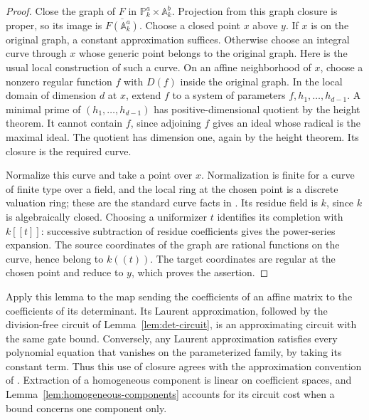 \begin{proof}
Close the graph of $F$ in $\mathbb P^a_k\times\mathbb A^b_k$.
Projection from this graph closure is proper, so its image is
$\overline{F(\mathbb A^a_k)}$.  Choose a closed point $x$ above
$y$.  If $x$ is on the original graph, a constant approximation
suffices.  Otherwise choose an integral curve through $x$ whose
generic point belongs to the original graph.  Here is the usual
local construction of such a curve.  On an affine neighborhood of
$x$, choose a nonzero regular function $f$ with $D(f)$ inside the
original graph.  In the local domain of dimension $d$ at $x$, extend
$f$ to a system of parameters $f,h_1,\ldots,h_{d-1}$.  A minimal
prime of $(h_1,\ldots,h_{d-1})$ has positive-dimensional quotient
by the height theorem.  It cannot contain $f$, since adjoining $f$
gives an ideal whose radical is the maximal ideal.  The quotient
has dimension one, again by the height theorem.  Its closure is
the required curve.

Normalize this curve and take a point over $x$.  Normalization is
finite for a curve of finite type over a field, and the local ring
at the chosen point is a discrete valuation ring; these are the
standard curve facts in \cite[Section~33.43, Lemmas~33.43.6 and
33.43.8]{StacksProject}.  Its residue field is $k$, since $k$ is
algebraically closed.  Choosing a uniformizer $t$ identifies its
completion with $k[[t]]$: successive subtraction of residue
coefficients gives the power-series expansion.  The source
coordinates of the graph are rational functions on the curve,
hence belong to $k((t))$.  The target coordinates are regular at
the chosen point and reduce to $y$, which proves the assertion.
\end{proof}

Apply this lemma to the map sending the coefficients of an affine
matrix to the coefficients of its determinant.  Its Laurent
approximation, followed by the division-free circuit of
Lemma~\ref{lem:det-circuit}, is an approximating circuit with the
same gate bound.  Conversely, any Laurent approximation satisfies
every polynomial equation that vanishes on the parameterized
family, by taking its constant term.  Thus this use of closure
agrees with the approximation convention of
\cite[Definitions~1.3 and N.1, pp.~2 and 62]{Anthropic2026}.
Extraction of a homogeneous component is linear on coefficient
spaces, and Lemma~\ref{lem:homogeneous-components} accounts for
its circuit cost when a bound concerns one component only.

